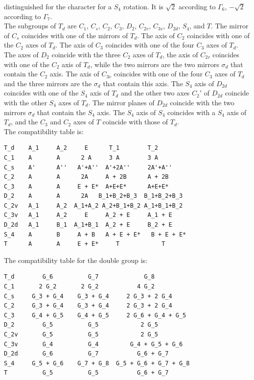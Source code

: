 \documentclass[12pt,a4paper]{article}
\begin{document}
distinguished for the character for a $S_4$ rotation. It is $\sqrt{2}$
according to $\Gamma_6$, $-\sqrt{2}$ according to $\Gamma_7$. \\
The subgroups of $T_d$ are $C_1$, $C_s$, $C_2$, $C_3$, $D_2$, $C_{2v}$,
$C_{3v}$, $D_{2d}$, $S_4$, and $T$. The mirror of $C_s$ coincides with one
of the mirrors of $T_d$. The axis of $C_2$ coincides with one of the $C_2$
axes of $T_d$. The axis of $C_3$ coincides with one of the four $C_3$
axes of $T_d$. The axes of $D_2$ coincide with the three $C_2$ axes of
$T_d$, the axis of $C_{2v}$ coincides with one of the $C_2$ axis of 
$T_d$, while the two mirrors are the two mirrors $\sigma_d$ that contain
the $C_2$ axis. The axis of $C_{3v}$ coincides with one of the four
$C_3$ axes of $T_d$ and the three mirrors are the $\sigma_d$ that 
contain this axis. The $S_4$ axis of $D_{2d}$ coincides with one of
the $S_4$ axis of $T_d$ and the other two axes $C_2'$ of $D_{2d}$ coincide with the 
other $S_4$ axes of $T_d$. The mirror planes of $D_{2d}$ coincide with the two
mirrors $\sigma_d$ that contain the $S_4$ axis. The $S_4$ axis of $S_4$ 
coincides with a $S_4$ axis of $T_d$, and the $C_3$ and $C_2$ axes of $T$ 
coincide with those of $T_d$. \\
The compatibility table is:
\begin{verbatim}
T_d    A_1     A_2     E      T_1        T_2
C_1    A       A      2 A     3 A        3 A
C_s    A'      A''   A'+A''  A'+2A''     2A'+A''
C_2    A       A      2A     A + 2B      A + 2B
C_3    A       A     E + E*  A+E+E*      A+E+E*
D_2    A       A      2A   B_1+B_2+B_3  B_1+B_2+B_3
C_2v   A_1     A_2  A_1+A_2 A_2+B_1+B_2 A_1+B_1+B_2
C_3v   A_1     A_2     E     A_2 + E     A_1 + E   
D_2d   A_1     B_1  A_1+B_1  A_2 + E     B_2 + E
S_4    A       B     A + B   A + E + E*   B + E + E*  
T      A       A     E + E*     T            T
\end{verbatim}
The compatibility table for the double group is:
\begin{verbatim}
T_d        G_6          G_7             G_8
C_1       2 G_2       2 G_2           4 G_2
C_s     G_3 + G_4    G_3 + G_4     2 G_3 + 2 G_4
C_2     G_3 + G_4    G_3 + G_4     2 G_3 + 2 G_4
C_3     G_4 + G_5    G_4 + G_5     2 G_6 + G_4 + G_5
D_2        G_5          G_5            2 G_5
C_2v       G_5          G_5            2 G_5
C_3v       G_4          G_4         G_4 + G_5 + G_6
D_2d       G_6          G_7           G_6 + G_7
S_4     G_5 + G_6    G_7 + G_8  G_5 + G_6 + G_7 + G_8  
T          G_5          G_5           G_6 + G_7
\end{verbatim}
\end{document}
